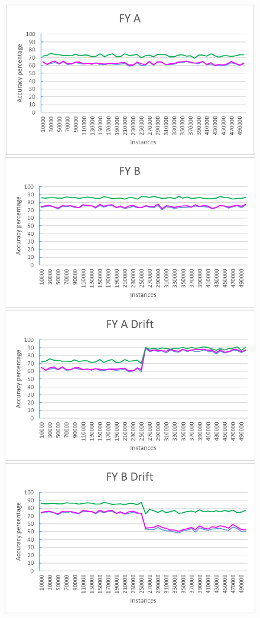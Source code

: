 \begin{figure}[h]
\includegraphics[scale=0.17]{Graphs/FY_A/vsDFW}
\includegraphics[scale=0.17]{Graphs/FY_B/vsDFW}
\includegraphics[scale=0.17]{Graphs/FY_A_Drift/vsDFW}
\includegraphics[scale=0.17]{Graphs/FY_B_Drift/vsDFW}

\end{figure}
